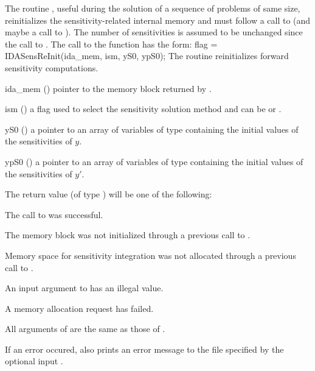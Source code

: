 The routine , useful during the solution of a sequence of problems of 
same size, reinitializes the sensitivity-related internal memory 
and must follow a call to  (and maybe a call to ). 
The number  of sensitivities is assumed to be unchanged since the call to 
.
The call to the  function has the form:
{
  flag = IDASensReInit(ida\_mem, ism, yS0, ypS0);
}
{
  The routine  reinitializes forward sensitivity computations.
}
{
  \begin{args}

  \item[ida\_mem] ()
    pointer to the {\idas} memory block returned by .

  \item[ism] ()
    a flag used to select the sensitivity solution method and can 
    be  or .
  \item[yS0] () 
    a pointer to an array of  variables of type  containing the 
    initial values of the sensitivities of $y$.
  \item[ypS0] () 
    a pointer to an array of  variables of type  containing the 
    initial values of the sensitivities of $y'$.
  \end{args}
}
{
  The return value  (of type ) will be one of the following:
  \begin{args}
  \item[\Id{IDA\_SUCCESS}]
    The call to  was successful.
  \item[\Id{IDA\_MEM\_NULL}] 
    The {\idas} memory block was not initialized through a 
    previous call to .
  \item[\Id{IDA\_NO\_SENS}]
    Memory space for sensitivity integration was not allocated through a 
    previous call to .
  \item[\Id{IDA\_ILL\_INPUT}] 
    An input argument to  has an illegal value.    
  \item[\Id{IDA\_MEM\_FAIL}] 
    A memory allocation request has failed.
  \end{args}
}
{
  All arguments of  are the same as those of
  .

  If an error occured,  also prints an error message to the
  file specified by the optional input .
}
